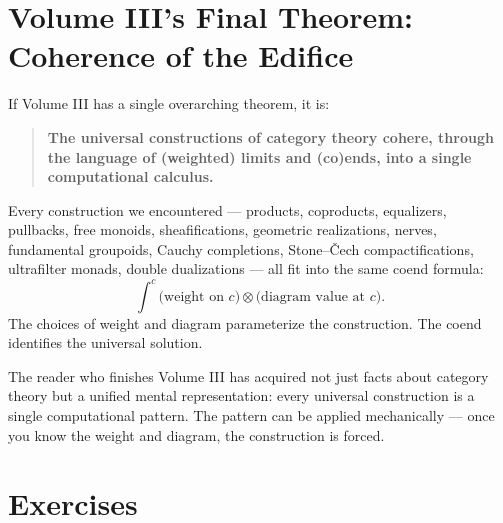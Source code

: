 \section{Volume III's Final Theorem: Coherence of the Edifice}
\label{sec:vol3-coherence}

If Volume III has a single overarching theorem, it is:

\begin{quote}
\textbf{The universal constructions of category theory cohere, through the
language of (weighted) limits and (co)ends, into a single computational
calculus.}
\end{quote}

\noindent Every construction we encountered — products, coproducts,
equalizers, pullbacks, free monoids, sheafifications, geometric realizations,
nerves, fundamental groupoids, Cauchy completions, Stone--\v Cech
compactifications, ultrafilter monads, double dualizations — all fit into
the same coend formula:
\[
  \int^c \text{(weight on } c\text{)} \otimes \text{(diagram value at } c\text{)}.
\]
The choices of weight and diagram parameterize the construction. The coend
identifies the universal solution.

\begin{remark}
The reader who finishes Volume III has acquired not just facts about
category theory but a unified mental representation: every universal
construction is a single computational pattern. The pattern can be applied
mechanically — once you know the weight and diagram, the construction is
forced.
\end{remark}


\section{Exercises}
\label{sec:formal-landscape-exercises}

